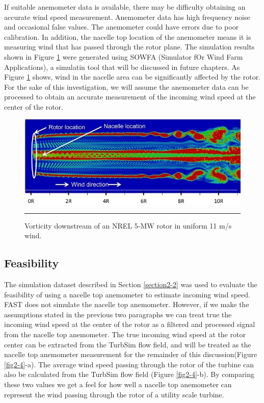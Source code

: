 If suitable anemometer data is available, there may be difficulty obtaining an accurate wind speed measurement. Anemometer data  has high frequency noise and occasional false values. The anemometer could have errors due to poor calibration. In addition, the nacelle top location of the anemometer means it is measuring wind that has passed through the rotor plane. The simulation results shown in Figure \ref{fig2-3} were generated using SOWFA (Simulator fOr Wind Farm Applications), a simulatin tool that will be discussed in future chapters. As Figure \ref{fig2-3} shows, wind in the nacelle area can be significantly affected by the rotor. For the sake of this investigation, we will assume the anemometer data can be processed to obtain an accurate measurement of the incoming wind speed at the center of the rotor.



\begin{figure}[htbp]
	\centering
		\includegraphics[width = \linewidth]{Figures/ch2Figures/fig2-3.jpg}
		\rule{35em}{0.5pt}
	\caption{Vorticity downstream of an NREL 5-MW rotor in uniform 11 m/s wind.}
	\label{fig2-3}
\end{figure}





\subsection{Feasibility}

The simulation dataset described in Section \ref{section2-2} was used to evaluate the feasibility of using a nacelle top anemometer to estimate incoming wind speed.  FAST does not simulate the nacelle top anemometer. However, if we make the assumptions stated in the previous two paragraphs we can treat true the incoming wind speed at the center of the rotor as a filtered and processed signal from the nacelle top anemometer. The true incoming wind speed at the rotor center can be extracted from the TurbSim flow field, and will be treated as the nacelle top anemometer measurement for the remainder of this discussion(Figure \ref{fig2-4}-a). The average wind speed passing through the rotor of the turbine can also be calculated from the TurbSim flow field (Figure  \ref{fig2-4}-b). By comparing these two values we get a feel for how well a nacelle top anemometer can represent the wind passing through the rotor of a utility scale turbine.


